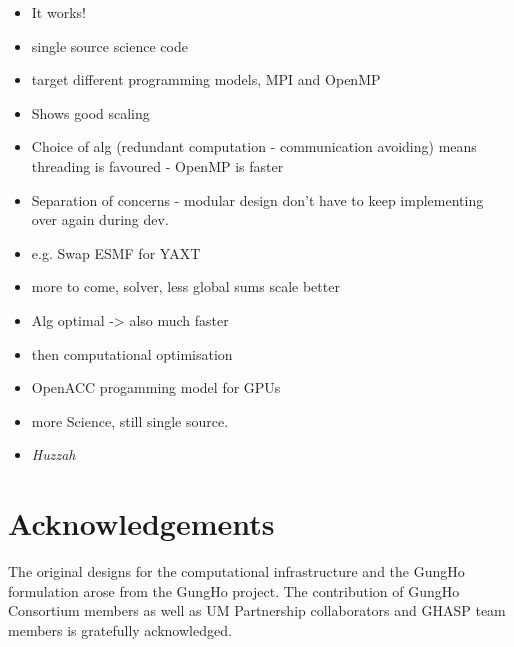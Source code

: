 \documentclass[review,times]{elsarticle}
\begin{document}
\label{sec:con}
\begin{itemize}
   \item It works! 
   \item single source science code
   \item target different programming models, MPI and OpenMP
   \item Shows good scaling
   \item Choice of alg (redundant computation - communication
     avoiding) means threading is favoured - OpenMP is faster
   \item Separation of concerns - modular design don't have to keep
     implementing over again during dev.
   \item e.g. Swap ESMF for YAXT
   \item more to come, solver, less global sums scale better
   \item Alg optimal -> also much faster
   \item then computational optimisation
   \item OpenACC progamming model for GPUs
   \item more Science, still single source.
   \item {\em Huzzah}
\end{itemize}

\section*{Acknowledgements}
The original designs for the computational infrastructure and the GungHo
formulation arose from the GungHo project. The contribution of GungHo
Consortium members as well as UM Partnership collaborators and GHASP team
members is gratefully acknowledged. 

\newpage


\end{document}
